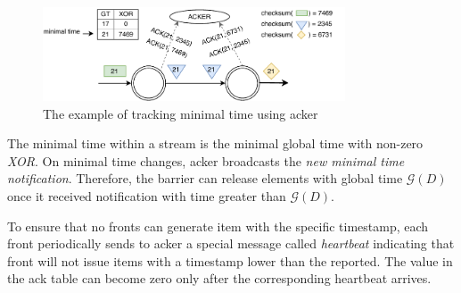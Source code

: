 \begin{figure}[ht]
  \centering
  \includegraphics[width=0.8\textwidth]{pics/acker}
  \caption{The example of tracking minimal time using acker}
  \label {acker}
\end{figure}

The minimal time within a stream is the minimal global time with non-zero {\it XOR}. On minimal time changes, acker broadcasts the {\it new minimal time notification}. 
Therefore, the barrier can release elements with global time $\mathcal{G} (D)$ 
once it received notification with time greater than $\mathcal{G} (D)$.

To ensure that no fronts can generate item with the specific timestamp, each front periodically sends to acker a special message called {\it heartbeat} indicating that front will not issue items with a timestamp lower than the reported. The value in the ack table can become zero only after the corresponding heartbeat arrives.
